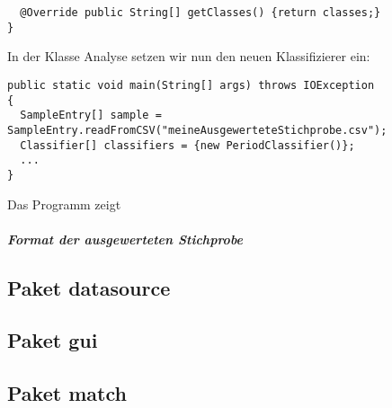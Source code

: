 \begin{bsp}
\begin{lstlisting}
  @Override public String[] getClasses() {return classes;}
}
\end{lstlisting}
In der Klasse Analyse setzen wir nun den neuen Klassifizierer ein:
\begin{lstlisting}
public static void main(String[] args) throws IOException
{
  SampleEntry[] sample = SampleEntry.readFromCSV("meineAusgewerteteStichprobe.csv");
  Classifier[] classifiers = {new PeriodClassifier()};
  ...
}
\end{lstlisting}
Das Programm zeigt 
\end{bsp}

\subparagraph*{Format der ausgewerteten Stichprobe}

\subsection{Paket datasource}
\subsection{Paket gui}
\subsection{Paket match}

